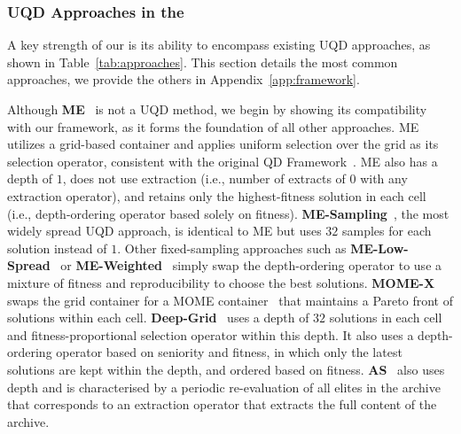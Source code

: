 


\subsubsection{UQD Approaches in the \framework{}}
A key strength of our \framework{} is its ability to encompass existing UQD approaches, as shown in Table~\ref{tab:approaches}. This section details the most common approaches, we provide the others in Appendix~\ref{app:framework}.

Although \textbf{ME}~\cite{map_elites} is not a UQD method, we begin by showing its compatibility with our framework, as it forms the foundation of all other approaches.
ME utilizes a grid-based container and applies uniform selection over the grid as its selection operator, consistent with the original QD Framework~\cite{framework}. ME also has a depth of $1$, does not use extraction (i.e., number of extracts of $0$ with any extraction operator), and retains only the highest-fitness solution in each cell (i.e., depth-ordering operator based solely on fitness). 
\textbf{ME-Sampling}~\cite{adaptive}, the most widely spread UQD approach, is identical to ME but uses $32$ samples for each solution instead of $1$. Other fixed-sampling approaches such as \textbf{ME-Low-Spread}~\cite{mace2023quality} or \textbf{ME-Weighted}~\cite{flageat2024exploring} simply swap the depth-ordering operator to use a mixture of fitness and reproducibility to choose the best solutions. 
\textbf{MOME-X}~\cite{flageat2024exploring} swaps the grid container for a MOME container~\cite{pierrot2022multi} that maintains a Pareto front of solutions within each cell. 
\textbf{Deep-Grid}~\cite{flageat2020fast} uses a depth of $32$ solutions in each cell and fitness-proportional selection operator within this depth.
It also uses a depth-ordering operator based on seniority and fitness, in which only the latest solutions are kept within the depth, and ordered based on fitness.
\textbf{AS}~\cite{flageat2023uncertain} also uses depth and is characterised by a periodic re-evaluation of all elites in the archive that corresponds to an extraction operator that extracts the full content of the archive. 


